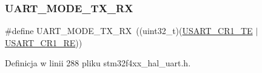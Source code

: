 \subsubsection{\texorpdfstring{U\+A\+R\+T\+\_\+\+M\+O\+D\+E\+\_\+\+T\+X\+\_\+\+RX}{UART\_MODE\_TX\_RX}}
{\footnotesize\ttfamily \#define U\+A\+R\+T\+\_\+\+M\+O\+D\+E\+\_\+\+T\+X\+\_\+\+RX~((uint32\+\_\+t)(\hyperlink{group___peripheral___registers___bits___definition_gade7f090b04fd78b755b43357ecaa9622}{U\+S\+A\+R\+T\+\_\+\+C\+R1\+\_\+\+TE} $\vert$ \hyperlink{group___peripheral___registers___bits___definition_gada0d5d407a22264de847bc1b40a17aeb}{U\+S\+A\+R\+T\+\_\+\+C\+R1\+\_\+\+RE}))}



Definicja w linii 288 pliku stm32f4xx\+\_\+hal\+\_\+uart.\+h.

